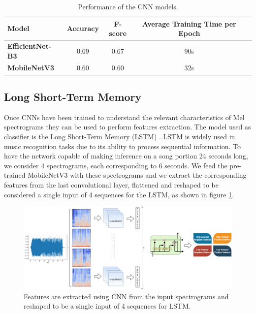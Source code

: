 \documentclass[runningheads]{llncs}
\begin{document}
\begin{table}
\caption{Performance of the CNN models.}
\label{tab2}
\centering
\begin{tabular}{|l|c|c|c|c|}
\hline
\textbf{Model} &  \textbf{Accuracy} & \textbf{F-score}  & \textbf{Average Training Time per Epoch}\\
\hline
\textbf{EfficientNet-B3} &  0.69  & 0.67 & 90s\\
\textbf{MobileNetV3} &  0.60 & 0.60 & 32s\\
\hline
\end{tabular}
\end{table}


\subsection{Long Short-Term Memory}

Once CNNs have been trained to understand the relevant characteristics of Mel spectrograms they can be used to perform features extraction. The model used as classifier is the Long Short-Term Memory (LSTM) \cite{hochreiter1997long}. LSTM is widely used in music recognition tasks due to its ability to process sequential information. 
To have the network capable of making inference on a song portion 24 seconds long, we consider 4 spectrograms, each corresponding to 6 seconds.
We feed the  pre-trained MobileNetV3 with these spectrograms and we extract the corresponding features from the last convolutional layer, flattened and reshaped to be considered a single input of 4 sequences for the LSTM, as shown in figure \ref{fig-train-lstm}. 



\begin{figure}
\centering
\includegraphics[scale = 0.5]{img/LSTM-Training.png}
\caption{Features are extracted using CNN from the input spectrograms and reshaped to be a single input of 4 sequences for LSTM.}
\label{fig-train-lstm}
\end{figure}
\end{document}
